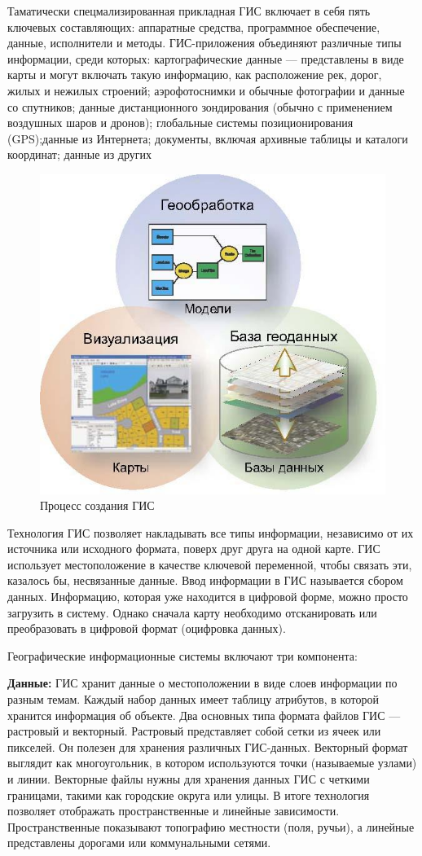 \documentclass[732,14pt,final]{studrep}
\begin{document}
Таматически спецмализированная прикладная ГИС включает в себя пять ключевых составляющих: аппаратные средства, программное обеспечение, данные, исполнители и методы. ГИС-приложения объединяют различные типы информации, среди которых: картографические данные — представлены в виде карты и могут включать такую информацию, как расположение рек, дорог, жилых и нежилых строений; аэрофотоснимки и обычные фотографии и данные со спутников; данные дистанционного зондирования (обычно с применением воздушных шаров и дронов); глобальные системы позиционирования (GPS);данные из Интернета; документы, включая архивные таблицы и каталоги координат; данные из других

  \begin{figure}[htp]
	\centering
	\includegraphics[width=0.7\linewidth]{pics/image15.png}
    \caption{Процесс создания ГИС}
    \label{fig:gis-design-process}
  \end{figure}

Технология ГИС позволяет накладывать все типы информации, независимо от их источника или исходного формата, поверх друг друга на одной карте. ГИС использует местоположение в качестве ключевой переменной, чтобы связать эти, казалось бы, несвязанные данные.
Ввод информации в ГИС называется сбором данных. Информацию, которая уже находится в цифровой форме, можно просто загрузить в систему. Однако сначала карту необходимо отсканировать или преобразовать в цифровой формат (оцифровка данных).

Географические информационные системы включают три компонента:

\textbf{Данные:} ГИС хранит данные о местоположении в виде слоев информации по разным темам. Каждый набор данных имеет таблицу атрибутов, в которой хранится информация об объекте. Два основных типа формата файлов ГИС — растровый и векторный. Растровый представляет собой сетки из ячеек или пикселей. Он полезен для хранения различных ГИС-данных. Векторный формат выглядит как многоугольник, в котором используются точки (называемые узлами) и линии. Векторные файлы нужны для хранения данных ГИС с четкими границами, такими как городские округа или улицы. В итоге технология позволяет отображать пространственные и линейные зависимости. Пространственные показывают топографию местности (поля, ручьи), а линейные представлены дорогами или коммунальными сетями.
\end{document}

